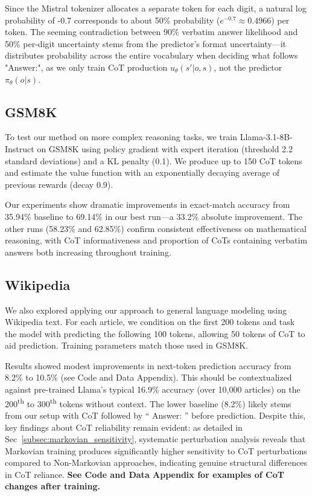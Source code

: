 \documentclass{article} %
\begin{document}
Since the Mistral tokenizer allocates a separate token for each digit, a natural log probability of -0.7 corresponds to about 50\% probability ($e^{-0.7} \approx 0.4966$) per token. The seeming contradiction between 90\% verbatim answer likelihood and 50\% per-digit uncertainty stems from the predictor's format uncertainty—it distributes probability across the entire vocabulary when deciding what follows "Answer:", as we only train CoT production $u_\theta(s'|o,s)$, not the predictor $\pi_\theta(o|s)$.

\subsection{GSM8K}
\label{subsec:gsm8k}
To test our method on more complex reasoning tasks, we train Llama-3.1-8B-Instruct on GSM8K using policy gradient with expert iteration (threshold 2.2 standard deviations) and a KL penalty (0.1). We produce up to 150 CoT tokens and estimate the value function with an exponentially decaying average of previous rewards (decay 0.9).

Our experiments show dramatic improvements in exact-match accuracy from 35.94\% baseline to 69.14\% in our best run—a 33.2\% absolute improvement. The other runs (58.23\% and 62.85\%) confirm consistent effectiveness on mathematical reasoning, with CoT informativeness and proportion of CoTs containing verbatim answers both increasing throughout training.

\subsection{Wikipedia}
\label{subsec:wikipedia}

We also explored applying our approach to general language modeling using Wikipedia text. For each article, we condition on the first 200 tokens and task the model with predicting the following 100 tokens, allowing 50 tokens of CoT to aid prediction. Training parameters match those used in GSM8K.

Results showed modest improvements in next-token prediction accuracy from 8.2\% to 10.5\% (see Code and Data Appendix). This should be contextualized against pre-trained Llama's typical 16.9\% accuracy (over 10,000 articles) on the 200\textsuperscript{th} to 300\textsuperscript{th} tokens without context. The lower baseline (8.2\%) likely stems from our setup with CoT followed by `` Answer: '' before prediction. Despite this, key findings about CoT reliability remain evident: as detailed in Sec~\ref{subsec:markovian_sensitivity}, systematic perturbation analysis reveals that Markovian training produces significantly higher sensitivity to CoT perturbations compared to Non-Markovian approaches, indicating genuine structural differences in CoT reliance.
\textbf{See Code and Data Appendix for examples of CoT changes after training.}
\end{document}
